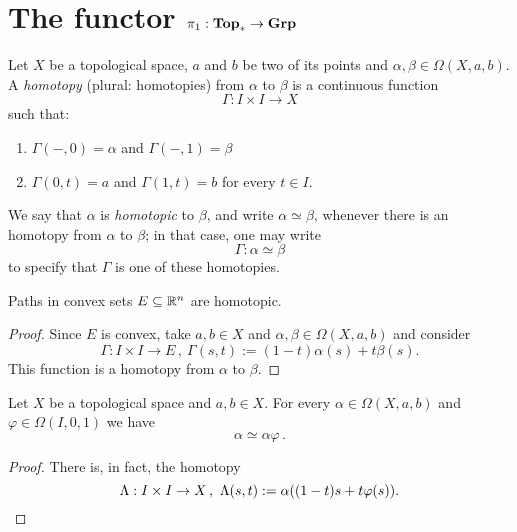 \section{The functor \(\pi_1 : \mathbf{Top}_\ast \to \mathbf{Grp}\)}

\begin{definition}[Homotopy]
Let \(X\) be a topological space, \(a\) and \(b\) be two of its points and \(\alpha, \beta \in \Omega(X, a, b)\). A {\em homotopy} (plural: homotopies) from \(\alpha\) to \(\beta\) is a continuous function
\[\Gamma : I \times I \to X\]
such that:
\begin{enumerate}
\item \(\Gamma(-, 0) = \alpha\) and \(\Gamma(-, 1) = \beta\)
\item \(\Gamma (0, t) = a\) and \(\Gamma(1, t) = b\) for every \(t \in I\).
\end{enumerate}
We say that \(\alpha\) is {\em homotopic} to \(\beta\), and write \(\alpha \simeq \beta\), whenever there is an homotopy from \(\alpha\) to \(\beta\); in that case, one may write
\[\Gamma : \alpha \simeq \beta\]
to specify that \(\Gamma\) is one of these homotopies.
\end{definition}

\begin{proposition}
Paths in convex sets \(E \subseteq \mathbb R^n\) are homotopic.
\end{proposition}

\begin{proof}
Since \(E\) is convex, take \(a, b \in X\) and \(\alpha, \beta \in \Omega(X, a, b)\) and consider
\[\Gamma : I \times I \to E\,, \ \Gamma(s, t) := (1-t)\alpha(s)+t\beta(s).\]
This function is a homotopy from \(\alpha\) to \(\beta\).
\end{proof}

\begin{lemma}\label{lemma:Param}
Let \(X\) be a topological space and \(a, b \in X\). For every \(\alpha \in \Omega(X, a, b)\) and \(\varphi \in \Omega(I, 0, 1)\) we have
\[\alpha \simeq \alpha \varphi\,.\]
\end{lemma}

\begin{proof}
There is, in fact, the homotopy
\[\Lambda : I \times I \to X\,, \ \Lambda(s, t) := \alpha((1-t)s+t\varphi(s)).\qedhere\]
\end{proof}

